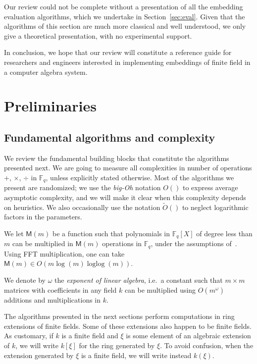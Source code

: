 \documentclass[12pt]{article}
\theoremstyle{plain}
\theoremstyle{definition}
\newcommand{\tildO}{\tilde{O}}
\DeclareMathOperator{\loglog}{loglog}
\def\F{\ensuremath{\mathbb{F}}}
\def\MM{\ensuremath{\mathsf{M}}}
\newcounter{algorithm}
\begin{document}
Our review could not be complete without a presentation of all the
embedding evaluation algorithms, which we undertake in
Section~\ref{sec:eval}. %
Given that the algorithms of this section are much more classical and
well understood, we only give a theoretical presentation, with no
experimental support. %

In conclusion, we hope that our review will constitute a reference
guide for researchers and engineers interested in implementing
embeddings of finite field in a computer algebra system.


\section{Preliminaries}
\label{sec:preliminaries}

\subsection{Fundamental algorithms and complexity}
We review the fundamental building blocks that constitute the
algorithms presented next.  We are going to measure all complexities
in number of operations $+$, $\times$, $\div$ in $\F_q$, unless
explicitly stated otherwise. Most of the algorithms we present are
randomized; we use the \emph{big-Oh} notation $O()$ to express average
asymptotic complexity, and we will make it clear when this complexity
depends on heuristics. We also occasionally use the notation
$\tildO()$ to neglect logarithmic factors in the parameters.

We let $\MM(m)$ be a function such that polynomials in $\F_q[X]$ of
degree less than $m$ can be multiplied in $\MM(m)$ operations in
$\F_q$, under the assumptions of~\cite[Ch.~8.3]{vzGG}. Using FFT
multiplication, one can take $\MM(m)\in O(m\log (m) \loglog (m))$.

We denote by $\omega$ the \emph{exponent of linear algebra}, i.e.\ a
constant such that $m\times m$ matrices with coefficients in any field
$k$ can be multiplied using $O(m^\omega)$ additions and
multiplications in $k$.

The algorithms presented in the next sections perform computations in
ring extensions of finite fields. Some of these extensions also happen
to be finite fields. As customary, if $k$ is a finite field and $\xi$
is some element of an algebraic extension of $k$, we will write
$k[\xi]$ for the ring generated by $\xi$. To avoid confusion, when the
extension generated by $\xi$ is a finite field, we will write instead
$k(\xi)$.
\end{document}
